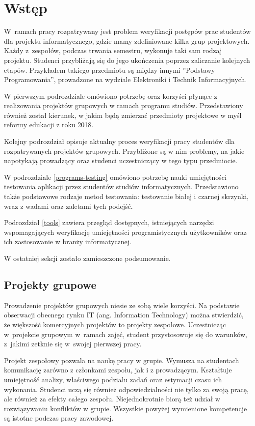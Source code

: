 \chapter{Wstęp}
\label{chapter:intro}

W~ramach pracy rozpatrywany jest problem weryfikacji postępów prac studentów dla projektu informatycznego, gdzie mamy zdefiniowane kilka grup projektowych.
Każdy z~zespołów, podczas trwania semestru, wykonuje taki sam rodzaj projektu.
Studenci przybliżają się do jego ukończenia poprzez zaliczanie kolejnych etapów.
Przykładem takiego przedmiotu są między innymi ”Podstawy Programowania”, prowadzone na wydziale Elektroniki i Technik Informacyjnych.

W pierwszym podrozdziale omówiono potrzebę oraz korzyści płynące z realizowania projektów grupowych w ramach programu studiów. 
Przedstawiony również został kierunek, w jakim będą zmierzać przedmioty projektowe w myśl reformy edukacji z roku 2018.

Kolejny podrozdział opisuje aktualny proces weryfikacji pracy studentów dla rozpatrywanych projektów grupowych.
Przybliżone są w nim problemy, na jakie napotykają prowadzący oraz studenci uczestniczący w tego typu przedmiocie.

W podrozdziale \ref{programs-testing} omówiono potrzebę nauki umiejętności testowania aplikacji przez studentów studiów informatycznych.
Przedstawiono także podstawowe rodzaje metod testowania: testowanie białej i czarnej skrzynki, wraz z wadami oraz zaletami tych podejść.

Podrozdział \ref{tools} zawiera przegląd dostępnych, istniejących narzędzi wspomagających weryfikację umiejętności programistycznych użytkowników oraz ich zastosowanie w branży informatycznej.

W ostatniej sekcji zostało zamieszczone podsumowanie.

\vfill

\section{Projekty grupowe}

Prowadzenie projektów grupowych niesie ze sobą wiele korzyści.
Na podstawie obserwacji obecnego rynku IT (ang. Information Technology) można stwierdzić, że większość komercyjnych projektów to projekty zespołowe.
Uczestnicząc w~projekcie grupowym w~ramach zajęć, student przystosowuje się do warunków, z~jakimi zetknie się w~swojej pierwszej pracy.

Projekt zespołowy pozwala na naukę pracy w grupie.
Wymusza na studentach komunikację zarówno z członkami zespołu, jak i z prowadzącym.
Kształtuje umiejętność analizy, właściwego podziału zadań oraz estymacji czasu ich wykonania.
Studenci uczą się również odpowiedzialności nie tylko za swoją pracę, ale również za efekty całego zespołu.
Niejednokrotnie biorą też udział w rozwiązywaniu konfliktów w grupie.
Wszystkie powyżej wymienione kompetencje są istotne podczas pracy zawodowej.


